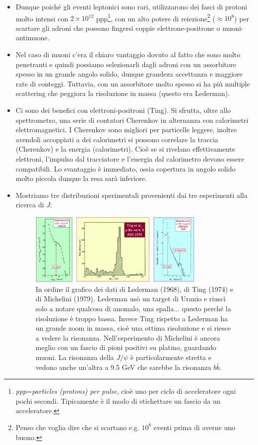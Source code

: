 \begin{itemize}
    \item Dunque poiché gli eventi leptonici sono rari, utilizzarono dei fasci di protoni molto intensi con $2\times10^{12}$ ppp\footnote{\textit{ppp}=\textit{particles (protons) per pulse}, cioè uno per ciclo di acceleratore ogni pochi secondi. Tipicamente è il modo di etichettare un fascio da un acceleratore.}, con un alto potere di reiezione\footnote{Penso che voglia dire che si scartano e.g. $10^8$ eventi prima di averne uno buono.} ($\approx10^8$) per scartare gli adroni che possono fingersi coppie elettrone-positrone o muoni-antimuone.
    \item Nel caso di muoni c'era il chiaro vantaggio dovuto al fatto che sono molto penetranti e quindi possiamo selezionarli dagli adroni con un assorbitore spesso in un grande angolo solido, dunque grandeza accettanza e maggiore rate di conteggi. Tuttavia, con un assorbitore molto spesso si ha più multiple scattering che peggiora la risoluzione in massa (questo era Lederman).
    \item Ci sono dei benefici con elettroni-positroni (Ting). Si sfrutta, oltre allo spettrometro, una serie di contatori Cherenkov in alternanza con calorimetri elettromagnetici. I Cherenkov sono migliori per particelle leggere, inoltre avendoli accoppiati a dei calorimetri si possono correlare la traccia (Cherenkov) e la energia (calorimetri). Cioè se si rivelano effettivamente elettroni, l'impulso dal tracciatore e l'energia dal calorimetro devono essere compatibili. Lo svantaggio è immediato, ossia copertura in angolo solido molto piccola dunque la resa sarà inferiore. 
    \item Mostriamo tre distribuzioni sperimentali provenienti dai tre esperimenti alla ricerca di $J$:
    \begin{figure}[H]
        \centering
        \includegraphics[width=0.8\textwidth]{immagini/fig_J_exp.png}
        \caption{In ordine il grafico dei dati di Lederman (1968), di Ting (1974) e di Michelini (1979). Lederman usò un target di Uranio e riuscì solo a notare qualcosa di anomalo, una spalla... questo perché la risoluzione è troppo bassa. Invece Ting rispetto a Lederman ha un grande zoom in massa, cioè una ottima risoluzione e si riesce a vedere la risonanza. Nell'esperimento di Michelini è ancora meglio con un fascio di pioni positivi su platino, guardando muoni. La risonanza della $J/\psi$ è particolarmente stretta e vedono anche un'altra a 9.5 GeV che sarebbe la risonanza $b\bar b$.}

\end{figure}
\end{itemize}
